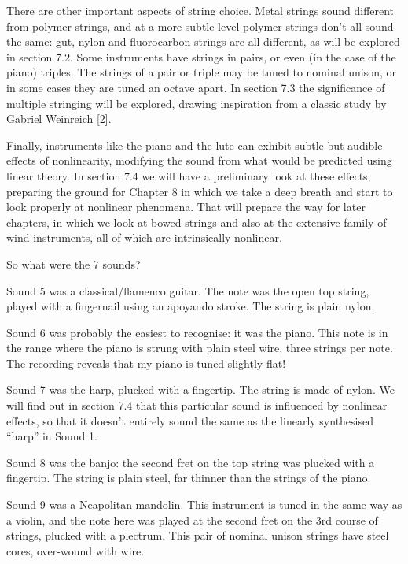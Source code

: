 \audio{}

\audio{}

  There are other important aspects of string choice. Metal strings sound 
  different from polymer strings, and at a more subtle level polymer strings 
  don’t all sound the same: gut, nylon and fluorocarbon strings are all 
  different, as will be explored in section 7.2. Some instruments have strings 
  in pairs, or even (in the case of the piano) triples. The strings of a pair 
  or triple may be tuned to nominal unison, or in some cases they are tuned an 
  octave apart. In section 7.3 the significance of multiple stringing will be 
  explored, drawing inspiration from a classic study by Gabriel Weinreich [2]. 

  Finally, instruments like the piano and the lute can exhibit subtle but 
  audible effects of nonlinearity, modifying the sound from what would be 
  predicted using linear theory. In section 7.4 we will have a preliminary look 
  at these effects, preparing the ground for Chapter 8 in which we take a deep 
  breath and start to look properly at nonlinear phenomena. That will prepare 
  the way for later chapters, in which we look at bowed strings and also at the 
  extensive family of wind instruments, all of which are intrinsically 
  nonlinear. 

  So what were the 7 sounds? 

  Sound 5 was a classical/flamenco guitar. The note was the open top string, 
  played with a fingernail using an apoyando stroke. The string is plain nylon. 

  Sound 6 was probably the easiest to recognise: it was the piano. This note is 
  in the range where the piano is strung with plain steel wire, three strings 
  per note. The recording reveals that my piano is tuned slightly flat! 

  Sound 7 was the harp, plucked with a fingertip. The string is made of nylon. 
  We will find out in section 7.4 that this particular sound is influenced by 
  nonlinear effects, so that it doesn't entirely sound the same as the linearly 
  synthesised ``harp'' in Sound 1. 

  Sound 8 was the banjo: the second fret on the top string was plucked with a 
  fingertip. The string is plain steel, far thinner than the strings of the 
  piano. 

  Sound 9 was a Neapolitan mandolin. This instrument is tuned in the same way 
  as a violin, and the note here was played at the second fret on the 3rd 
  course of strings, plucked with a plectrum. This pair of nominal unison 
  strings have steel cores, over-wound with wire. 

